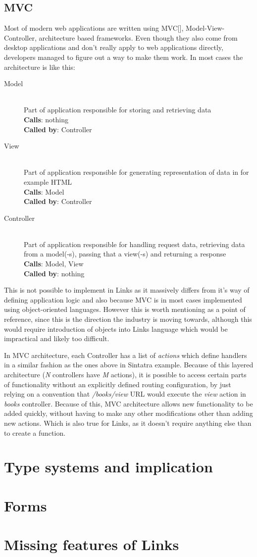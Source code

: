 \subsection{MVC}

Most of modern web applications are written using MVC[], Model-View-Controller, architecture based frameworks. Even though they also come from desktop applications and don't really apply to web applications directly, developers managed to figure out a way to make them work. In most cases the architecture is like this:

\begin{description}
  \item[Model] \hfill \\
  Part of application responsible for storing and retrieving data \\
  \textbf{Calls}: nothing \\
  \textbf{Called by}: Controller
  \item[View] \hfill \\
  Part of application responsible for generating representation of data in for example HTML \\
  \textbf{Calls}: Model \\
  \textbf{Called by}: Controller
  \item[Controller] \hfill \\
  Part of application responsible for handling request data, retrieving data from a model(-s), passing that a view(-s) and returning a response \\
  \textbf{Calls}: Model, View \\
  \textbf{Called by}: nothing
\end{description}

This is not possible to implement in Links as it massively differs from it's way of defining application logic and also because MVC is in most cases implemented using object-oriented languages. However this is worth mentioning as a point of reference, since this is the direction the industry is moving towards, although this would require introduction of objects into Links language which would be impractical and likely too difficult.

In MVC architecture, each Controller has a list of \textit{actions} which define handlers in a similar fashion as the ones above in Sintatra example. Because of this layered architecture (\textit{N} controllers have \textit{M} actions), it is possible to access certain parts of functionality without an explicitly defined routing configuration, by just relying on a convention that \textit{/books/view} URL would execute the \textit{view} action in \textit{books} controller. Because of this, MVC architecture allows new functionality to be added quickly, without having to make any other modifications other than adding new actions. Which is also true for Links, as it doesn't require anything else than to create a function.

\section{Type systems and implication}

\section{Forms}

\section{Missing features of Links}
